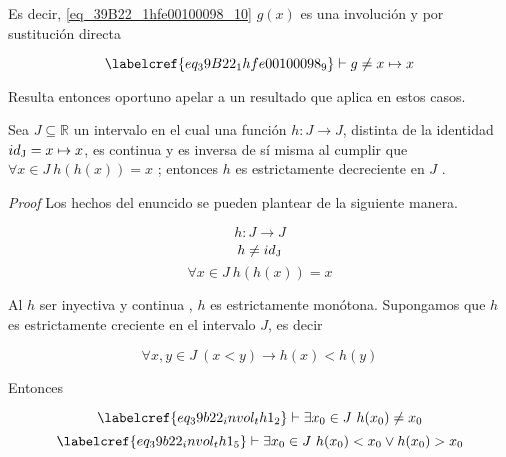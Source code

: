Es decir, \cref{eq_39B22_1hfe00100098_10} $g(x)$ es una involución y por sustitución directa 

\begin{equation} \label{eq_39B22_1hfe00100098_11}
	\labelcref{eq_39B22_1hfe00100098_9} \vdash g \neq x \mapsto x
\end{equation}

Resulta entonces oportuno apelar a un resultado que aplica en estos casos.

\begin{theorem} \label{39b22_invol_th1}
	Sea $J \subseteq \mathbb{R}$ un intervalo en el cual una función $h: J \to J$, distinta de la identidad $id\textsubscript{J} = x \mapsto x$, es continua y es inversa de sí misma al cumplir que $\forall x \in J\ h(h(x)) = x$ ; entonces $h$ es estrictamente decreciente en $J$ .
\end{theorem}

\textit{Proof} Los hechos del enuncido se pueden plantear de la siguiente manera.

\begin{equation} \label{eq_39b22_invol_th1_1}
	h: J \to J
\end{equation}
\begin{equation} \label{eq_39b22_invol_th1_2}
	h \neq id\textsubscript{J}
\end{equation}
\begin{equation} \label{eq_39b22_invol_th1_3}
	\forall x \in J\ h(h(x)) = x
\end{equation}

Al $h$  ser inyectiva y continua , $h$ es estrictamente monótona. Supongamos que $h$ es estrictamente creciente en el intervalo $J$, es decir

\begin{equation} \label{eq_39b22_invol_th1_4}
	\forall x,y \in J\ (x < y) \to h(x) < h(y)
\end{equation}

Entonces 

\begin{equation} \label{eq_39b22_invol_th1_5}
	\labelcref{eq_39b22_invol_th1_2} \vdash \exists x\textsubscript{0} \in J\ h(x\textsubscript{0}) \neq x\textsubscript{0}
\end{equation}
\begin{equation} \label{eq_39b22_invol_th1_6}
	\labelcref{eq_39b22_invol_th1_5} \vdash \exists x\textsubscript{0} \in J\ h(x\textsubscript{0}) < x\textsubscript{0} \lor h(x\textsubscript{0}) > x\textsubscript{0}
\end{equation}


